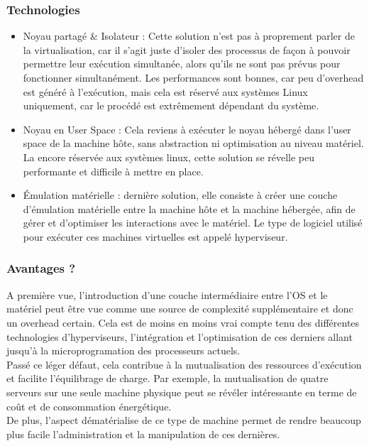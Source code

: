 \subsubsection{Technologies}

\begin{itemize}
\item Noyau partagé \& Isolateur : Cette solution n'est pas à proprement parler de la virtualisation, car il s'agit juste d'isoler des processus de façon à pouvoir permettre leur exécution simultanée, alors qu'ils ne sont pas prévus pour fonctionner simultanément. Les performances sont bonnes, car peu d'overhead est généré à l'exécution, mais cela est réservé aux systèmes Linux uniquement, car le procédé est extrêmement dépendant du système.
\item Noyau en User Space : Cela reviens à exécuter le noyau hébergé dans l'user space de la machine hôte, sans abstraction ni optimisation au niveau matériel. La encore réservée aux systèmes linux, cette solution se révelle peu performante et difficile à mettre en place.
\item Émulation matérielle  : dernière solution, elle consiste à créer une couche d'émulation matérielle entre la machine hôte et la machine hébergée, afin de gérer et d'optimiser les interactions avec le matériel. Le type de logiciel utilisé pour exécuter ces machines virtuelles est appelé hyperviseur.
\end{itemize}

\subsubsection{Avantages ?}

A première vue, l'introduction d'une couche intermédiaire entre l'OS et le matériel peut être vue comme une source de complexité supplémentaire et donc un overhead certain. Cela est de moins en moins vrai compte tenu des différentes technologies d'hyperviseurs, l'intégration et l'optimisation de ces derniers allant jusqu'à la microprogramation des processeurs actuels.\\
Passé ce léger défaut, cela contribue à la mutualisation des ressources d'exécution et facilite l'équilibrage de charge. Par exemple, la mutualisation de quatre serveurs sur une seule machine physique peut se révéler intéressante en terme de coût et de consommation énergétique.\\
De plus, l'aspect dématérialise de ce type de machine permet de rendre beaucoup plus facile l'administration et la manipulation de ces dernières.

